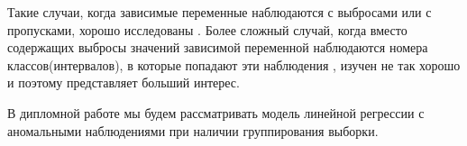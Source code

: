 Такие случаи, когда зависимые переменные наблюдаются с выбросами или с пропусками, хорошо исследованы \cite{OLSforGrouping}. 
Более сложный случай, когда вместо содержащих выбросы значений зависимой переменной наблюдаются номера классов(интервалов), в которые попадают эти наблюдения \cite{technometrics}, изучен не так хорошо и поэтому представляет больший интерес.

В дипломной работе мы будем рассматривать модель линейной регрессии с аномальными наблюдениями при наличии группирования выборки.